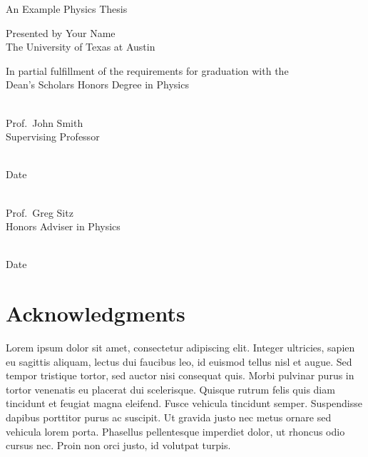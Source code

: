 \documentclass[letterpaper,11pt,oneside]{memoir} %
\newcommand{\sigline}{\noindent
\makebox[2in]{\hrulefill}\\}
\begin{document}

\begin{titlingpage}
\begin{center}
\begin{Spacing}{2}
{\huge
  An Example Physics Thesis
}
\end{Spacing}
\end{center}

\begin{center}
  Presented by Your Name\\
  The University of Texas at Austin
\end{center}

\begin{center}
In partial fulfillment of the requirements for graduation with the\\
Dean’s Scholars Honors Degree in Physics
\end{center}

\vskip 1in

\begin{minipage}[t]{0.4\textwidth}
\sigline
Prof.~John Smith\\
Supervising Professor
\end{minipage}\hskip 1in
\begin{minipage}[t]{0.4\textwidth}
\sigline
Date
\end{minipage}

\vskip 0.75in

\begin{minipage}[t]{0.4\textwidth}
\sigline
Prof.~Greg Sitz\\
Honors Adviser in Physics
\end{minipage}\hskip 1in
\begin{minipage}[t]{0.4\textwidth}
\sigline
Date
\end{minipage}
\end{titlingpage}

\cleardoublepage

\chapter*{Acknowledgments}

Lorem ipsum dolor sit amet, consectetur adipiscing elit. Integer ultricies,
sapien eu sagittis aliquam, lectus dui faucibus leo, id euismod tellus nisl et
augue. Sed tempor tristique tortor, sed auctor nisi consequat quis. Morbi
pulvinar purus in tortor venenatis eu placerat dui scelerisque. Quisque rutrum
felis quis diam tincidunt et feugiat magna eleifend. Fusce vehicula tincidunt
semper. Suspendisse dapibus porttitor purus ac suscipit. Ut gravida justo nec
metus ornare sed vehicula lorem porta. Phasellus pellentesque imperdiet dolor,
ut rhoncus odio cursus nec. Proin non orci justo, id volutpat turpis.
\end{document}
